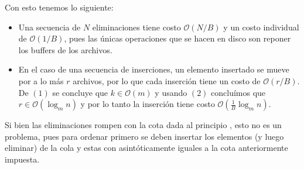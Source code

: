 \documentclass[dcc,uchile]{fcfmcourse}
\begin{document}
\begin{problems}
\begin{itemize}
    Con esto tenemos lo siguiente:
    \begin{itemize}
        \item Una secuencia de $N$ eliminaciones tiene costo $\mathcal{O}(N/B)$ y un costo individual de $\mathcal{O}(1/B)$, pues las únicas operaciones que se hacen en disco son reponer los buffers de los archivos.
        \item En el caso de una secuencia de inserciones, un elemento insertado se mueve por a lo más $r$ archivos, por lo que cada inserción tiene un costo de $\mathcal{O}(r/B)$. De $(1)$ se concluye que $k \in \mathcal{O}(m)$ y usando $(2)$ concluímos que $r\in\mathcal{O}(\log_{m}n)$ y por lo tanto la inserción tiene costo $\mathcal{O}\left(\frac{1}{B}\log_{m}n\right)$.
    \end{itemize}
    Si bien las eliminaciones rompen con la cota dada al principio \fear, esto no es un problema, pues para ordenar primero se deben insertar los elementos (y luego eliminar) de la cola y estas con asintóticamente iguales a la cota anteriormente impuesta.
\end{itemize}
\end{problems}
\end{document}
